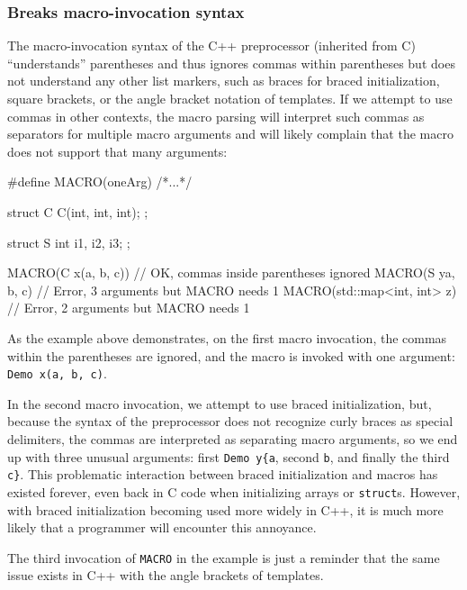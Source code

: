 \subsubsection[Breaks macro-invocation syntax]{Breaks macro-invocation syntax}\label{breaks-macro-invocation-syntax}

The macro-invocation syntax of the C++ preprocessor (inherited from C)
``understands'' parentheses and thus ignores commas within parentheses
but does not understand any other list markers, such as braces for
braced initialization, square brackets, or the angle bracket notation of
templates. If we attempt to use commas in other contexts, the macro
parsing will interpret such commas as separators for multiple macro
arguments and will likely complain that the macro does not support that
many arguments:

\begin{emcppslisting}
#define MACRO(oneArg) /*...*/

struct C
{
    C(int, int, int);
};

struct S
{
    int i1, i2, i3;
};

MACRO(C x(a, b, c))         // OK, commas inside parentheses ignored
MACRO(S y{a, b, c})         // Error, 3 arguments but MACRO needs 1
MACRO(std::map<int, int> z) // Error, 2 arguments but MACRO needs 1
\end{emcppslisting}


\noindent As the example above demonstrates, on the first macro invocation, the
commas within the parentheses are ignored, and the macro is invoked with
one argument: \lstinline!Demo!~\lstinline!x(a,!~\lstinline!b,!~\lstinline!c)!.

In the second macro invocation, we attempt to use braced initialization,
but, because the syntax of the preprocessor does not recognize curly
braces as special delimiters, the commas are interpreted as separating
macro arguments, so we end up with three unusual arguments: first
\lstinline!Demo!~\lstinline!y{a!, second \lstinline!b!, and finally the third
\lstinline!c}!. This problematic interaction between braced initialization
and macros has existed forever, even back in C code when initializing
arrays or \lstinline!struct!s. However, with braced initialization becoming
used more widely in C++, it is much more likely that a programmer will
encounter this annoyance.

The third invocation of \lstinline!MACRO! in the example is just a reminder
that the same issue exists in C++ with the angle brackets of templates.

